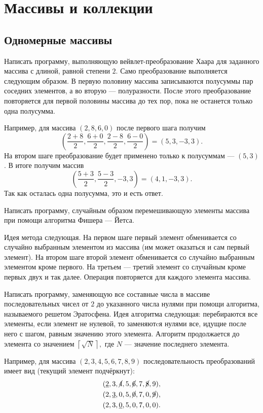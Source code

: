 \section{Массивы и коллекции}

\subsection{Одномерные массивы}

\task Написать программу, выполняющую вейвлет-преобразование
Хаара для заданного массива с
длиной, равной степени $2$. Само преобразование выполняется следующим
образом. В первую половину массива записываются полусуммы пар соседних
элементов, а во вторую — полуразности. После этого преобразование
повторяется для первой половины массива до тех пор, пока не останется
только одна полусумма.

Например, для массива $(2, 8, 6, 0)$ после первого шага получим
\[
\left(\frac{2+8}2, \frac{6+0}2, \frac{2-8}2, \frac{6-0}2\right) = (5, 3, -3, 3).
\]
На втором шаге преобразование будет применено только к полусуммам —
$(5, 3)$. В итоге получим массив
\[
\left(\frac{5+3}2, \frac{5-3}2, -3, 3\right) = (4, 1, -3, 3).
\]
Так как осталась одна полусумма, это и есть ответ.

\task Написать программу, случайным образом перемешивающую элементы
массива при помощи алгоритма Фишера — Йетса.

Идея метода следующая. На первом шаге первый элемент обменивается со
случайно выбранным элементом из массива (им может оказаться и сам
первый элемент). На втором шаге второй элемент обменивается со
случайно выбранным элементом кроме первого. На третьем — третий
элемент со случайным кроме первых двух и так далее. Операция
повторяется для каждого элемента массива.

\task Написать программу, заменяющую все составные числа в массиве
последовательных чисел от $2$ до указанного числа нулями при помощи
алгоритма, называемого решетом Эратосфена.
Идея алгоритма следующая: перебираются все элементы, если элемент не
нулевой, то заменяютcя нулями все, идущие после него с шагом, равным
значению этого элемента. Алгоритм продолжается до элемента со
значением $\left\lceil\sqrt N\right\rceil,$ где $N$ — значение
последнего элемента.

Например, для массива $(2, 3, 4, 5, 6, 7, 8, 9)$ последовательность
преобразований имеет вид (текущий элемент подчёркнут):
\begin{eqnarray*}
&(\underline2, 3, \cancel4, 5, \cancel6, 7, \cancel8, 9),\\
&(2, \underline3, 0, 5, \cancel0, 7, 0, \cancel9),\\
&(2, 3, \underline0, 5, 0, 7, 0, 0).
\end{eqnarray*}

